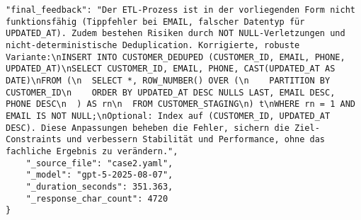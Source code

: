 \begin{lstlisting}[caption={Ausgabe: GPT-5 Anwendungsfall 2 Hauptdurchlauf},label={gpt_case2_prompt1}]
    "final_feedback": "Der ETL-Prozess ist in der vorliegenden Form nicht funktionsfähig (Tippfehler bei EMAIL, falscher Datentyp für UPDATED_AT). Zudem bestehen Risiken durch NOT NULL-Verletzungen und nicht-deterministische Deduplication. Korrigierte, robuste Variante:\nINSERT INTO CUSTOMER_DEDUPED (CUSTOMER_ID, EMAIL, PHONE, UPDATED_AT)\nSELECT CUSTOMER_ID, EMAIL, PHONE, CAST(UPDATED_AT AS DATE)\nFROM (\n  SELECT *, ROW_NUMBER() OVER (\n    PARTITION BY CUSTOMER_ID\n    ORDER BY UPDATED_AT DESC NULLS LAST, EMAIL DESC, PHONE DESC\n  ) AS rn\n  FROM CUSTOMER_STAGING\n) t\nWHERE rn = 1 AND EMAIL IS NOT NULL;\nOptional: Index auf (CUSTOMER_ID, UPDATED_AT DESC). Diese Anpassungen beheben die Fehler, sichern die Ziel-Constraints und verbessern Stabilität und Performance, ohne das fachliche Ergebnis zu verändern.",
    "_source_file": "case2.yaml",
    "_model": "gpt-5-2025-08-07",
    "_duration_seconds": 351.363,
    "_response_char_count": 4720
}
\end{lstlisting}

